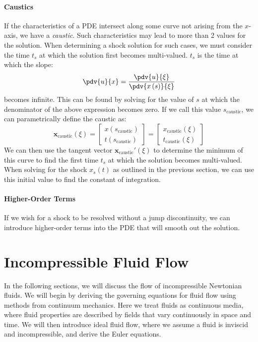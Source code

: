 \documentclass{article}
\theoremstyle{definition}
\begin{document}
\subsection{Caustics}
If the characteristics of a PDE intersect along some curve not arising
from the \(x\)-axis, we have a \textit{caustic}. Such characteristics
may lead to more than 2 values for the solution. When determining a
shock solution for such cases, we must consider the time \(t_s\) at
which the solution first becomes multi-valued. \(t_s\) is the time at
which the slope:
\begin{equation*}
    \pdv{u}{x} = \frac{\pdv{u}{\xi}}{\pdv{x\left( s \right)}{\xi}}
\end{equation*}
becomes infinite. This can be found by solving for the value of \(s\) at
which the denominator of the above expression becomes zero. If we call
this value \(s_{\text{caustic}}\), we can parametrically define the
caustic as:
\begin{equation*}
    \symbf{x}_{\text{caustic}}\left( \xi \right) =
    \begin{bmatrix}
        x\left( s_{\text{caustic}} \right) \\
        t\left( s_{\text{caustic}} \right)
    \end{bmatrix}
    =
    \begin{bmatrix}
        x_{\text{caustic}} \left( \xi \right) \\
        t_{\text{caustic}} \left( \xi \right)
    \end{bmatrix}
\end{equation*}
We can then use the tangent vector \(\symbf{x}_{\text{caustic}}'\left( \xi \right)\)
to determine the minimum of this curve to find the first time \(t_s\) at
which the solution becomes multi-valued. When solving for the shock
\(x_s\left( t \right)\) as outlined in the previous section, we can use
this initial value to find the constant of integration.
\subsection{Higher-Order Terms}
If we wish for a shock to be resolved without a jump discontinuity, we
can introduce higher-order terms into the PDE that will smooth out the
solution.
\part{Incompressible Fluid Flow}
In the following sections, we will discuss the flow of incompressible
Newtonian fluids. We will begin by deriving the governing equations for
fluid flow using methods from continuum mechanics. Here we treat fluids
as continuous media, where fluid properties are described by fields
that vary continuously in space and time. We will then introduce ideal
fluid flow, where we assume a fluid is inviscid and incompressible, and
derive the Euler equations.
\end{document}

